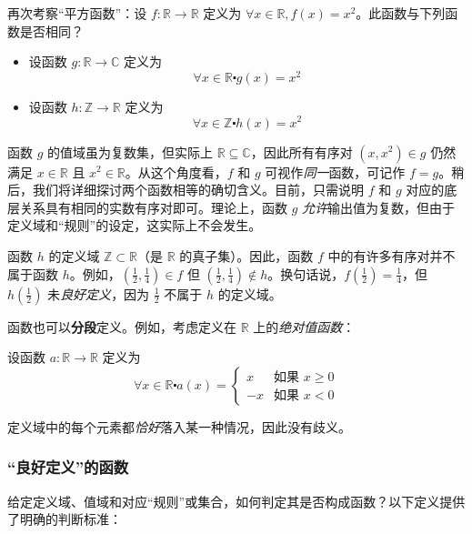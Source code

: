 \begin{example}
    再次考察``平方函数''：设 $f : \mathbb{R} \to \mathbb{R}$ 定义为 $\forall x \in \mathbb{R}, f(x) = x^2$。此函数与下列函数是否相同？
    \begin{itemize}
        \item 设函数 $g : \mathbb{R} \to \mathbb{C}$ 定义为
            \[\forall x \in \mathbb{R} \centerdot g(x) = x^2\]
        \item 设函数 $h : \mathbb{Z} \to \mathbb{R}$ 定义为
            \[\forall x \in \mathbb{Z} \centerdot h(x) = x^2\]
    \end{itemize}

    函数 $g$ 的值域虽为复数集，但实际上 $\mathbb{R} \subseteq \mathbb{C}$，因此所有有序对 $(x, x^2) \in g$ 仍然满足 $x \in \mathbb{R}$ 且 $x^2 \in \mathbb{R}$。从这个角度看，$f$ 和 $g$ 可视作\emph{同一}函数，可记作 $f = g$。稍后，我们将详细探讨两个函数相等的确切含义。目前，只需说明 $f$ 和 $g$ 对应的底层关系具有相同的实数有序对即可。理论上，函数 $g$ \emph{允许}输出值为复数，但由于定义域和``规则''的设定，这实际上不会发生。

    函数 $h$ 的定义域 $\mathbb{Z} \subset \mathbb{R}$（是 $\mathbb{R}$ 的真子集）。因此，函数 $f$ 中的有许多有序对并不属于函数 $h$。例如，$(\frac{1}{2}, \frac{1}{4}) \in f$ 但 $(\frac{1}{2}, \frac{1}{4}) \notin h$。换句话说，$f(\frac{1}{2}) = \frac{1}{4}$，但 $h(\frac{1}{2})$ 未\emph{良好定义}，因为 $\frac{1}{2}$ 不属于 $h$ 的定义域。
\end{example}

\begin{example}
    函数也可以\textbf{分段}定义。例如，考虑定义在 $\mathbb{R}$ 上的\emph{绝对值函数}：

    设函数 $a : \mathbb{R} \to \mathbb{R}$ 定义为
    \[\forall x \in \mathbb{R} \centerdot a(x) = 
    \begin{cases}
         x &\text{如果\ } x \ge 0 \\
        -x &\text{如果\ } x < 0
    \end{cases}\]

    定义域中的每个元素都\emph{恰好}落入某一种情况，因此没有歧义。
\end{example}

\subsubsection*{``良好定义''的函数}

给定定义域、值域和对应``规则''或集合，如何判定其是否构成函数？以下定义提供了明确的判断标准：

